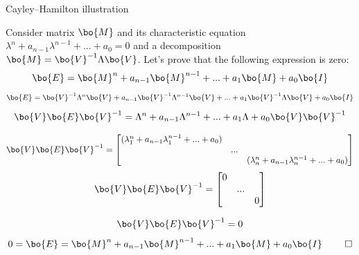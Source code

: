 \documentclass{beamer}
\begin{document}
\begin{frame}{Cayley–Hamilton illustration}
	\begin{flushleft}
		
		Consider matrix $\bo{M}$ and its characteristic equation $\lambda^n + a_{n-1}\lambda^{n-1} + ... + a_0  = 0$ and a decomposition $\bo{M} = \bo{V}^{-1}\Lambda \bo{V}$. Let's prove that the following expression is zero:
		\begin{equation}
			\bo{E} = \bo{M}^n + a_{n-1}\bo{M}^{n-1} + ... + a_1\bo{M} + a_0\bo{I}
		\end{equation}	
		\begin{equation}
		\bo{E} = \bo{V}^{-1}\Lambda^n \bo{V} + a_{n-1}\bo{V}^{-1}\Lambda^{n-1} \bo{V} + ... + a_1\bo{V}^{-1}\Lambda \bo{V} + a_0\bo{I}
		\end{equation}	
		\begin{equation}
		 \bo{V}\bo{E} \bo{V}^{-1} = \Lambda^n + a_{n-1}\Lambda^{n-1}  + ... + a_1\Lambda+ a_0\bo{V}\bo{V}^{-1} 
		\end{equation}	
		\begin{small}
			\begin{equation}
				\bo{V}\bo{E} \bo{V}^{-1} = 
				\begin{bmatrix}
					(\lambda_1^n + a_{n-1}\lambda_1^{n-1} + ... + a_0 ) & & \\
					& ... & \\
					& & (\lambda_n^n + a_{n-1}\lambda_n^{n-1} + ... + a_0 )
				\end{bmatrix}
			\end{equation}	
		\begin{equation}
		\bo{V}\bo{E} \bo{V}^{-1} = 
		\begin{bmatrix}
			0 & & \\
			& ... & \\
			& & 0
		\end{bmatrix}
		\end{equation}	
	\end{small}
		\begin{equation}
		\bo{V}\bo{E} \bo{V}^{-1} = 0
		\end{equation}	
		\begin{equation}
		0 = \bo{E} = \bo{M}^n + a_{n-1}\bo{M}^{n-1} + ... + a_1\bo{M} + a_0\bo{I} \ \qed
		\end{equation}	
		
		
	\end{flushleft}
\end{frame}
\end{document}
